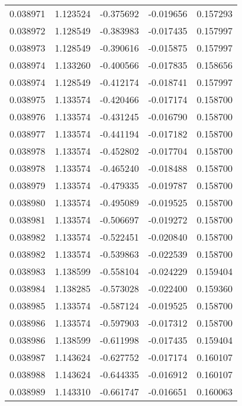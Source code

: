 \begin{tabular}{lrrrr}
0.038971    &  1.123524 & -0.375692 & -0.019656 &             0.157293 \\
0.038972    &  1.128549 & -0.383983 & -0.017435 &             0.157997 \\
0.038973    &  1.128549 & -0.390616 & -0.015875 &             0.157997 \\
0.038974    &  1.133260 & -0.400566 & -0.017835 &             0.158656 \\
0.038974    &  1.128549 & -0.412174 & -0.018741 &             0.157997 \\
0.038975    &  1.133574 & -0.420466 & -0.017174 &             0.158700 \\
0.038976    &  1.133574 & -0.431245 & -0.016790 &             0.158700 \\
0.038977    &  1.133574 & -0.441194 & -0.017182 &             0.158700 \\
0.038978    &  1.133574 & -0.452802 & -0.017704 &             0.158700 \\
0.038978    &  1.133574 & -0.465240 & -0.018488 &             0.158700 \\
0.038979    &  1.133574 & -0.479335 & -0.019787 &             0.158700 \\
0.038980    &  1.133574 & -0.495089 & -0.019525 &             0.158700 \\
0.038981    &  1.133574 & -0.506697 & -0.019272 &             0.158700 \\
0.038982    &  1.133574 & -0.522451 & -0.020840 &             0.158700 \\
0.038982    &  1.133574 & -0.539863 & -0.022539 &             0.158700 \\
0.038983    &  1.138599 & -0.558104 & -0.024229 &             0.159404 \\
0.038984    &  1.138285 & -0.573028 & -0.022400 &             0.159360 \\
0.038985    &  1.133574 & -0.587124 & -0.019525 &             0.158700 \\
0.038986    &  1.133574 & -0.597903 & -0.017312 &             0.158700 \\
0.038986    &  1.138599 & -0.611998 & -0.017435 &             0.159404 \\
0.038987    &  1.143624 & -0.627752 & -0.017174 &             0.160107 \\
0.038988    &  1.143624 & -0.644335 & -0.016912 &             0.160107 \\
0.038989    &  1.143310 & -0.661747 & -0.016651 &             0.160063 \\

\end{tabular}
